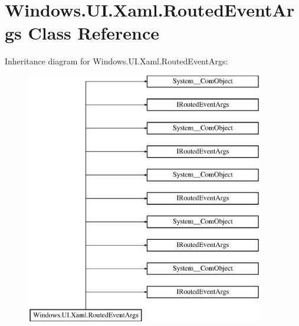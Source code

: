 \hypertarget{class_windows_1_1_u_i_1_1_xaml_1_1_routed_event_args}{}\section{Windows.\+U\+I.\+Xaml.\+Routed\+Event\+Args Class Reference}
\label{class_windows_1_1_u_i_1_1_xaml_1_1_routed_event_args}
Inheritance diagram for Windows.\+U\+I.\+Xaml.\+Routed\+Event\+Args\+:\begin{figure}[H]
\begin{center}
\leavevmode
\includegraphics[height=11.000000cm]{class_windows_1_1_u_i_1_1_xaml_1_1_routed_event_args}
\end{center}
\end{figure}
